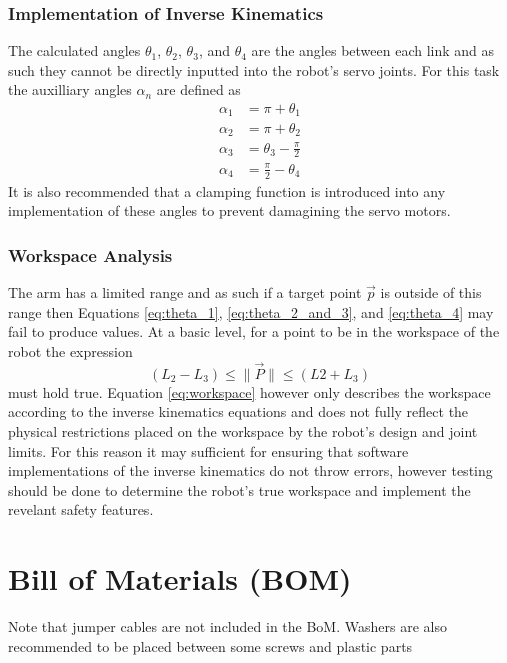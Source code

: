 \documentclass[a4paper,11pt]{article}
\begin{document}
\subsubsection{Implementation of Inverse Kinematics}
The calculated angles $\theta_{1}$, $\theta_{2}$, $\theta_{3}$, and $\theta_{4}$ are the angles between each link and as such they cannot be directly inputted into the robot's servo joints. For this task the auxilliary angles $\alpha_{n}$ are defined as
\begin{align*}
    \alpha_{1} &= \pi + \theta_{1} \\
    \alpha_{2} &= \pi + \theta_{2} \\
    \alpha_{3} &= \theta_{3} - \frac{\pi}{2} \\
    \alpha_{4} &= \frac{\pi}{2} - \theta_{4}
\end{align*}
It is also recommended that a clamping function is introduced into any implementation of these angles to prevent damagining the servo motors.

\subsubsection{Workspace Analysis}
The arm has a limited range and as such if a target point $\vec{p}$ is outside of this range then Equations \ref{eq:theta_1}, \ref{eq:theta_2_and_3}, and \ref{eq:theta_4} may fail to produce values. At a basic level, for a point to be in the workspace of the robot the expression
\begin{equation}
    (L_{2} - L_{3}) \leq \lVert\vec{P}\rVert \leq (L{2} + L_{3})
    \label{eq:workspace}
\end{equation}
must hold true. Equation \ref{eq:workspace} however only describes the workspace according to the inverse kinematics equations and does not fully reflect the physical restrictions placed on the workspace by the robot's design and joint limits. For this reason it may sufficient for ensuring that software implementations of the inverse kinematics do not throw errors, however testing should be done to determine the robot's true workspace and implement the revelant safety features.

\newpage
\section{Bill of Materials (BOM)}
Note that jumper cables are not included in the BoM. Washers are also recommended to be placed between some screws and plastic parts
\end{document}
